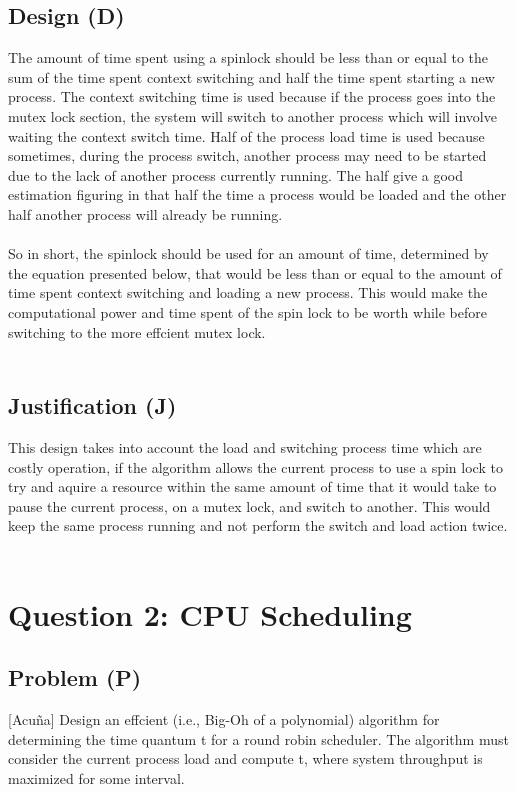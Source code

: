 \documentclass[12pt]{article}
\begin{document}
        \subsection{Design (D)}
        The amount of time spent using a spinlock should be less than or equal to the sum of the time spent context
        switching and half the time spent starting a new process. The context switching time is used because if the 
        process goes into the mutex lock section, the system will switch to another process which will involve waiting
        the context switch time. Half of the process load time is used because sometimes, during the process switch, 
        another process may need to be started due to the lack of another process currently running. The half give a
        good estimation figuring in that half the time a process would be loaded and the other half another process 
        will already be running.\\
        \\
        So in short, the spinlock should be used for an amount of time, determined by the equation presented below, that
        would be less than or equal to the amount of time spent context switching and loading a new process. This would 
        make the computational power and time spent of the spin lock to be worth while before switching to the more effcient
        mutex lock.\\
        \\
        \subsection{Justification (J)}
        This design takes into account the load and switching process time which are costly operation, if the algorithm allows
        the current process to use a spin lock to try and aquire a resource within the same amount of time that it would take 
        to pause the current process, on a mutex lock, and switch to another. This would keep the same process running and not
        perform the switch and load action twice.\\
        \\

    \section{Question 2: CPU Scheduling}
        \subsection{Problem (P)}
        [Acuña] Design an effcient (i.e., Big-Oh of a polynomial) algorithm for determining the time quantum
        t for a round robin scheduler. The algorithm must consider the current process load and compute t,
        where system throughput is maximized for some interval. \\
        \\
\end{document}
